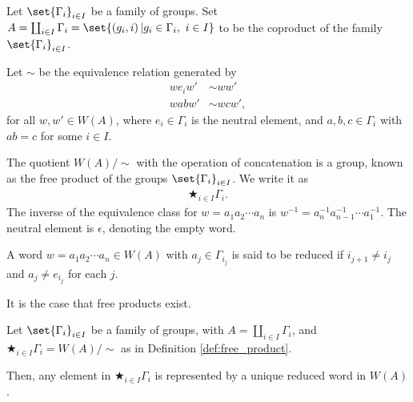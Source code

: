 \begin{definition}
  Let $\set{\Gamma_i}_{i\in I}$ be a family of groups. Set $A = \coprod_{i\in I}\Gamma_i = \set{\left(g_i,i\right) | g_i\in \Gamma_i,~i\in I}$ to be the coproduct of the family $\set{\Gamma_i}_{i\in I}$.\newline

  Let $\sim$ be the equivalence relation generated by
  \begin{align*}
    we_iw' &\sim ww'\\
    wabw' &\sim wcw',
  \end{align*}
  for all $w,w'\in W(A)$, where $e_i\in \Gamma_i$ is the neutral element, and $a,b,c\in \Gamma_i$ with $ab = c$ for some $i\in I$.\newline

  The quotient $W(A) / \sim$ with the operation of concatenation is a group, known as the {free product} of the groups $\set{\Gamma_i}_{i\in I}$. We write it as
  \begin{align*}
    \bigstar_{i\in I}\Gamma_i.
  \end{align*}
  The inverse of the equivalence class for $w = a_1a_2\cdots a_n$ is $w^{-1} = a_{n}^{-1}a_{n-1}^{-1}\cdots a_{1}^{-1}$. The neutral element is $\epsilon$, denoting the empty word.\newline

  A word $w = a_1a_2\cdots a_n\in W(A)$ with $a_j\in \Gamma_{i_j}$ is said to be {reduced} if $i_{j + 1}\neq i_j$ and $a_j \neq e_{i_j}$ for each $j$.\label{def:free_product}
\end{definition}
It is the case that free products exist.
\begin{proposition}
  Let $\set{\Gamma_i}_{i\in I}$ be a family of groups, with $A = \coprod_{i\in I}\Gamma_i$, and $\bigstar_{i\in I}\Gamma_i = W(A) / \sim$ as in Definition \ref{def:free_product}.\newline

  Then, any element in $\bigstar_{i\in I}\Gamma_i$ is represented by a unique reduced word in $W(A)$.\label{prop:reduced_words}
\end{proposition}
